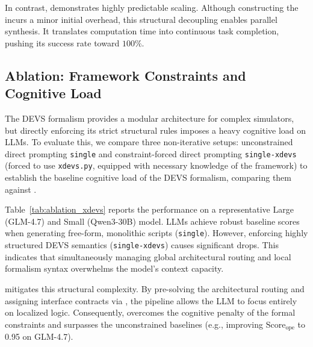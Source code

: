 In contrast, \methodname{} demonstrates highly predictable scaling. Although constructing the \plantree{} incurs a minor initial overhead, this structural decoupling enables parallel synthesis. It translates computation time into continuous task completion, pushing its success rate toward $100\%$.

\subsection{Ablation: Framework Constraints and Cognitive Load}
\label{sec:ablation_xdevs}

The DEVS formalism provides a modular architecture for complex simulators, but directly enforcing its strict structural rules imposes a heavy cognitive load on LLMs. To evaluate this, we compare three non-iterative setups: unconstrained direct prompting \texttt{single} and constraint-forced direct prompting \texttt{single-xdevs} (forced to use \texttt{xdevs.py}, equipped with necessary knowledge of the framework) to establish the baseline cognitive load of the DEVS formalism, comparing them against \methodname{}.

Table~\ref{tab:ablation_xdevs} reports the performance on a representative Large (GLM-4.7) and Small (Qwen3-30B) model. LLMs achieve robust baseline scores when generating free-form, monolithic scripts (\texttt{single}). However, enforcing highly structured DEVS semantics (\texttt{single-xdevs}) causes significant drops. This indicates that simultaneously managing global architectural routing and local formalism syntax overwhelms the model's context capacity.

\methodname{} mitigates this structural complexity. By pre-solving the architectural routing and assigning interface contracts via \plantree{}, the pipeline allows the LLM to focus entirely on localized logic. Consequently, \methodname{} overcomes the cognitive penalty of the formal constraints and surpasses the unconstrained baselines (e.g., improving $\text{Score}_{\text{ope}}$ to 0.95 on GLM-4.7).

